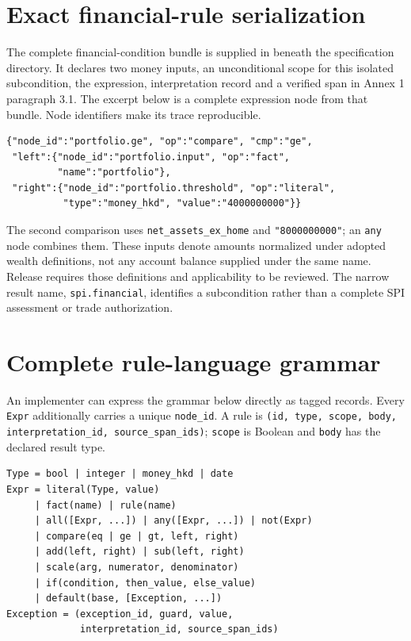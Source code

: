 \section{Exact financial-rule serialization}
\label{sec:financial-serialization}

The complete financial-condition bundle is supplied in
 beneath the specification directory.
It declares two money inputs, an unconditional scope for this isolated
subcondition, the expression, interpretation record and a verified span in
Annex 1 paragraph 3.1. The excerpt below is a complete expression node from
that bundle. Node identifiers make its trace reproducible.

\begin{minipage}{\textwidth}
\begin{lstlisting}[caption={The portfolio comparison in the supplied JSON bundle. Amounts are HK cents.}]
{"node_id":"portfolio.ge", "op":"compare", "cmp":"ge",
 "left":{"node_id":"portfolio.input", "op":"fact",
         "name":"portfolio"},
 "right":{"node_id":"portfolio.threshold", "op":"literal",
          "type":"money_hkd", "value":"4000000000"}}
\end{lstlisting}
\end{minipage}

The second comparison uses \texttt{net\_assets\_ex\_home} and
\texttt{"8000000000"}; an \texttt{any} node combines them. These inputs denote
amounts normalized under adopted wealth definitions, not any account balance
supplied under the same name. Release requires those definitions and applicability
to be reviewed. The narrow result name, \texttt{spi.financial}, identifies a
subcondition rather than a complete SPI assessment or trade authorization.


\section{Complete rule-language grammar}

An implementer can express the grammar below directly as tagged records. Every
\texttt{Expr} additionally carries a unique \texttt{node\_id}. A rule is
\texttt{(id, type, scope, body, interpretation\_id, source\_span\_ids)};
\texttt{scope} is Boolean and \texttt{body} has the declared result type.
\begin{lstlisting}[caption={Complete operator grammar for RuleIR 0.1; repeated arguments are ordered. The Java demonstration implements a stated subset.}]
Type = bool | integer | money_hkd | date
Expr = literal(Type, value)
     | fact(name) | rule(name)
     | all([Expr, ...]) | any([Expr, ...]) | not(Expr)
     | compare(eq | ge | gt, left, right)
     | add(left, right) | sub(left, right)
     | scale(arg, numerator, denominator)
     | if(condition, then_value, else_value)
     | default(base, [Exception, ...])
Exception = (exception_id, guard, value,
             interpretation_id, source_span_ids)
\end{lstlisting}


